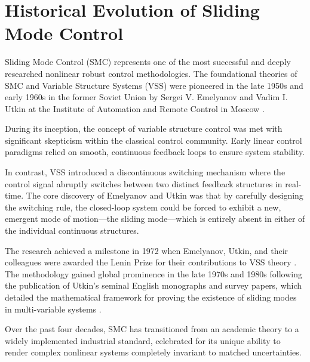 \section{Historical Evolution of Sliding Mode Control}
Sliding Mode Control (SMC) represents one of the most successful and deeply researched nonlinear robust control methodologies. The foundational theories of SMC and Variable Structure Systems (VSS) were pioneered in the late 1950s and early 1960s in the former Soviet Union by Sergei V. Emelyanov and Vadim I. Utkin at the Institute of Automation and Remote Control in Moscow \cite{ref_67, ref_68}.

During its inception, the concept of variable structure control was met with significant skepticism within the classical control community. Early linear control paradigms relied on smooth, continuous feedback loops to ensure system stability. 

In contrast, VSS introduced a discontinuous switching mechanism where the control signal abruptly switches between two distinct feedback structures in real-time. The core discovery of Emelyanov and Utkin was that by carefully designing the switching rule, the closed-loop system could be forced to exhibit a new, emergent mode of motion—the sliding mode—which is entirely absent in either of the individual continuous structures.

The research achieved a milestone in 1972 when Emelyanov, Utkin, and their colleagues were awarded the Lenin Prize for their contributions to VSS theory \cite{ref_68}. The methodology gained global prominence in the late 1970s and 1980s following the publication of Utkin's seminal English monographs and survey papers, which detailed the mathematical framework for proving the existence of sliding modes in multi-variable systems \cite{ref_67}. 

Over the past four decades, SMC has transitioned from an academic theory to a widely implemented industrial standard, celebrated for its unique ability to render complex nonlinear systems completely invariant to matched uncertainties.

